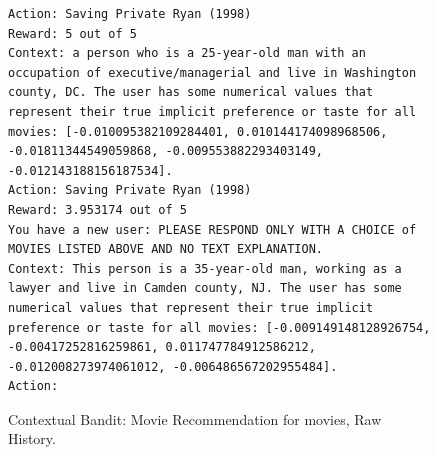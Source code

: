\documentclass[11pt, logo]{googledeepmind}
\theoremstyle{plain}
\theoremstyle{definition}
\begin{document}
\begin{figure}[ht]
\begin{lstlisting}[escapechar=!]
Action: Saving Private Ryan (1998)
Reward: 5 out of 5
Context: a person who is a 25-year-old man with an occupation of executive/managerial and live in Washington county, DC. The user has some numerical values that represent their true implicit preference or taste for all movies: [-0.010095382109284401, 0.010144174098968506, -0.01811344549059868, -0.009553882293403149, -0.012143188156187534].
Action: Saving Private Ryan (1998)
Reward: 3.953174 out of 5
You have a new user: PLEASE RESPOND ONLY WITH A CHOICE of MOVIES LISTED ABOVE AND NO TEXT EXPLANATION.
Context: This person is a 35-year-old man, working as a lawyer and live in Camden county, NJ. The user has some numerical values that represent their true implicit preference or taste for all movies: [-0.009149148128926754, -0.00417252816259861, 0.011747784912586212, -0.012008273974061012, -0.006486567202955484].
Action:
    \end{lstlisting}
    \caption{Contextual Bandit: Movie Recommendation for movies, Raw History.}
    \label{fig:cb_movie_10_rh}
\end{figure}
\end{document}
